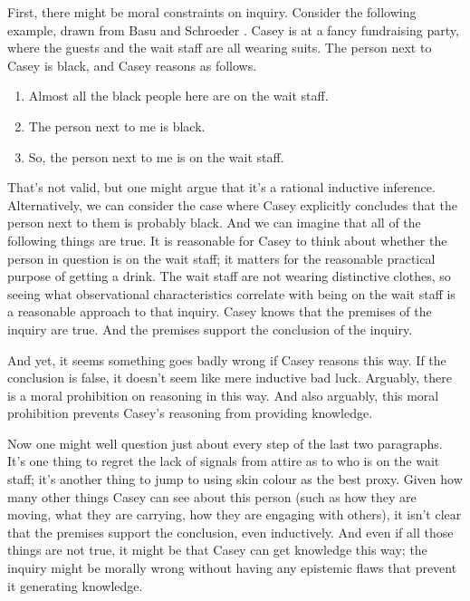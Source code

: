 \documentclass[
  11pt,
]{book}
\providecommand{\tightlist}{%
  \setlength{\itemsep}{0pt}\setlength{\parskip}{0pt}}
\begin{document}
First, there might be moral constraints on inquiry. Consider the following example, drawn from Basu and Schroeder \citeyearpar{BasuSchroeder2019}. Casey is at a fancy fundraising party, where the guests and the wait staff are all wearing suits. The person next to Casey is black, and Casey reasons as follows.

\begin{enumerate}
\def\labelenumi{\arabic{enumi}.}
\tightlist
\item
  Almost all the black people here are on the wait staff.
\item
  The person next to me is black.
\item
  So, the person next to me is on the wait staff.
\end{enumerate}

That's not valid, but one might argue that it's a rational inductive inference. Alternatively, we can consider the case where Casey explicitly concludes that the person next to them is probably black. And we can imagine that all of the following things are true. It is reasonable for Casey to think about whether the person in question is on the wait staff; it matters for the reasonable practical purpose of getting a drink. The wait staff are not wearing distinctive clothes, so seeing what observational characteristics correlate with being on the wait staff is a reasonable approach to that inquiry. Casey knows that the premises of the inquiry are true. And the premises support the conclusion of the inquiry.

And yet, it seems something goes badly wrong if Casey reasons this way. If the conclusion is false, it doesn't seem like mere inductive bad luck. Arguably, there is a moral prohibition on reasoning in this way. And also arguably, this moral prohibition prevents Casey's reasoning from providing knowledge.

Now one might well question just about every step of the last two paragraphs. It's one thing to regret the lack of signals from attire as to who is on the wait staff; it's another thing to jump to using skin colour as the best proxy. Given how many other things Casey can see about this person (such as how they are moving, what they are carrying, how they are engaging with others), it isn't clear that the premises support the conclusion, even inductively. And even if all those things are not true, it might be that Casey can get knowledge this way; the inquiry might be morally wrong without having any epistemic flaws that prevent it generating knowledge.
\end{document}
